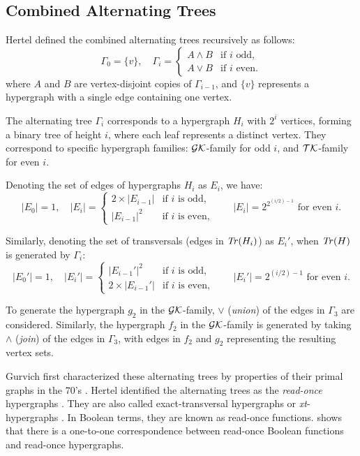 \subsection{Combined Alternating Trees}

Hertel defined the combined alternating trees recursively as follows:
\[
\Gamma_0=\{v\},\quad\Gamma_i=\begin{cases}A\wedge B&\text{if }i\text{ odd},\\A\vee B&\text{if }i\text{ even.}\end{cases}
\]
where $A$ and $B$ are vertex-disjoint copies of $\Gamma_{i-1}$, and $\{v\}$ represents a hypergraph with a single edge containing one vertex. \cite{Her04}

The alternating tree $\Gamma_i$ corresponds to a hypergraph $H_i$ with $2^i$ vertices, forming a binary tree of height $i$, where each leaf represents a distinct vertex. They correspond to specific hypergraph families: $\mathcal{GK}$-family for odd $i$, and $\mathcal{TK}$-family for even $i$.

Denoting the set of edges of hypergraphs $H_i$ as $E_i$, we have:
\[
|E_0|=1,\quad|E_i|=\begin{cases}2\times|E_{i-1}|&\text{if }i\text{ is odd,}\\|E_{i-1}|^2&\text{if }i\text{ is even,}\end{cases}\qquad|E_i|=2^{2^{(i/2)-1}}\text{ for even }i.
\]

Similarly, denoting the set of transversals (edges in $\mathit{Tr}(H_i)$) as $E_i'$, when $\mathit{Tr}(H)$ is generated by $\Gamma_i$:
\[
|E_0'|=1,\quad|E_i'|=\begin{cases}|E_{i-1}'|^2&\text{if }i\text{ is odd,}\\2\times|E_{i-1}'|&\text{if }i\text{ is even,}\end{cases}\qquad|E_i'|=2^{(i/2)-1}\text{ for even }i.
\]

To generate the hypergraph $g_2$ in the $\mathcal{GK}$-family, $\vee$ (\emph{union}) of the edges in $\Gamma_3$ are considered. Similarly, the hypergraph $f_2$ in the $\mathcal{GK}$-family is generated by taking $\wedge$ (\emph{join}) of the edges in $\Gamma_3$, with edges in $f_2$ and $g_2$ representing the resulting vertex sets.

Gurvich first characterized these alternating trees by properties of their primal graphs in the 70's \cite{Gc77}. Hertel identified the alternating trees as the \emph{read-once} hypergraphs \cite{Her04}. They are also called exact-transversal hypergraphs or \emph{xt}-hypergraphs \cite{Eit94}. In Boolean terms, they are known as read-once functions. \cite{GMR06} shows that there is a one-to-one correspondence between read-once Boolean functions and read-once hypergraphs.

